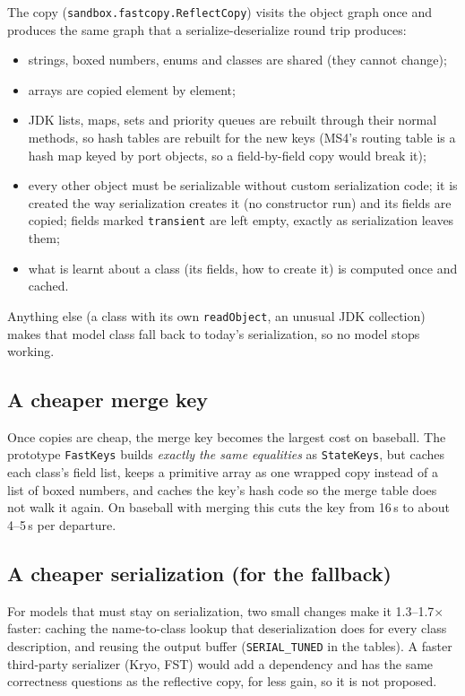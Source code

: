 \documentclass[11pt]{article}
\newcommand{\code}[1]{\texttt{#1}}
\newcommand{\us}{\,\textmu s}
\begin{document}
The copy (\code{sandbox.fastcopy.ReflectCopy}) visits the object graph once and produces the same graph that a
serialize-deserialize round trip produces:
\begin{itemize}
\item strings, boxed numbers, enums and classes are shared (they cannot change);
\item arrays are copied element by element;
\item JDK lists, maps, sets and priority queues are rebuilt through their normal methods, so hash tables are rebuilt
  for the new keys (MS4's routing table is a hash map keyed by port objects, so a field-by-field copy would break it);
\item every other object must be serializable without custom serialization code; it is created the way serialization
  creates it (no constructor run) and its fields are copied; fields marked \code{transient} are left empty, exactly as
  serialization leaves them;
\item what is learnt about a class (its fields, how to create it) is computed once and cached.
\end{itemize}
Anything else (a class with its own \code{readObject}, an unusual JDK collection) makes that model class fall back to
today's serialization, so no model stops working.

\subsection{A cheaper merge key}
Once copies are cheap, the merge key becomes the largest cost on baseball. The prototype \code{FastKeys} builds
\emph{exactly the same equalities} as \code{StateKeys}, but caches each class's field list, keeps a primitive array as
one wrapped copy instead of a list of boxed numbers, and caches the key's hash code so the merge table does not walk
it again. On baseball with merging this cuts the key from 16\us{} to about 4--5\us{} per departure.

\subsection{A cheaper serialization (for the fallback)}
For models that must stay on serialization, two small changes make it 1.3--1.7$\times$ faster: caching the
name-to-class lookup that deserialization does for every class description, and reusing the output buffer
(\code{SERIAL\_TUNED} in the tables). A faster third-party serializer (Kryo, FST) would add a dependency and has the
same correctness questions as the reflective copy, for less gain, so it is not proposed.
\end{document}
